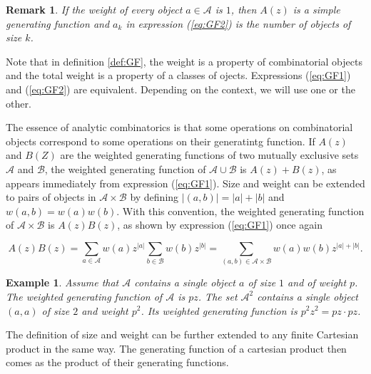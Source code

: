 \documentclass{article}
\newtheorem{example}{Example}
\newtheorem{remark}{Remark}
\begin{document}
\begin{remark}
\label{rem:noweight}
If the weight of every object $a \in \mathcal{A}$ is $1$, then $A(z)$ is a
simple generating function and $a_k$ in expression (\ref{eq:GF2}) is
the number of objects of size $k$.
\end{remark}

Note that in definition \ref{def:GF}, the weight is a property of
combinatorial objects and the total weight is a property of a classes of
ojects. Expressions (\ref{eq:GF1}) and (\ref{eq:GF2}) are equivalent.
Depending on the context, we will use one or the other.

The essence of analytic combinatorics is that some operations on
combinatorial objects correspond to some operations on their generatintg
function. If $A(z)$ and $B(Z)$ are the weighted generating functions of
two mutually exclusive sets $\mathcal{A}$ and $\mathcal{B}$, the weighted
generating function of $\mathcal{A} \cup \mathcal{B}$ is $A(z) + B(z)$, as
appears immediately from expression (\ref{eq:GF1}). Size and weight can be
extended to pairs of objects in $\mathcal{A} \times \mathcal{B}$ by
defining $|(a,b)| = |a| + |b|$ and $w(a,b) = w(a)w(b)$. With this
convention, the weighted generating function of $\mathcal{A} \times
\mathcal{B}$ is $A(z)B(z)$, as shown by expression (\ref{eq:GF1})
once again

\begin{equation*}
A(z)B(z) =
\sum_{a\in \mathcal{A}}w(a)z^{|a|} \sum_{b\in \mathcal{B}}w(b)z^{|b|}
= \sum_{(a,b) \in \mathcal{A} \times \mathcal{B}} w(a)w(b)z^{|a|+|b|}.
\end{equation*}

\begin{example}
\label{ex:simple}
Assume that $\mathcal{A}$ contains a single object $a$ of size $1$ and of
weight $p$. The weighted generating function of $\mathcal{A}$ is $pz$.
The set $\mathcal{A}^2$ contains a single object $(a,a)$ of size $2$ and
weight $p^2$. Its weighted generating function is $p^2z^2 = pz \cdot pz$.
\end{example}

The definition of size and weight can be further extended to any finite
Cartesian product in the same way. The generating function of a cartesian
product then comes as the product of their generating functions.
\end{document}
